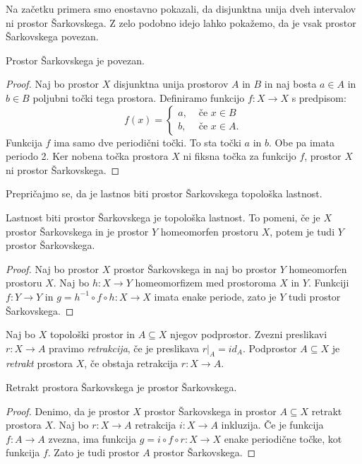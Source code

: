 \documentclass[mat2]{fmfdelo}
\begin{document}
Na začetku primera smo enostavno pokazali, da disjunktna unija dveh intervalov ni prostor Šarkovskega. Z zelo podobno idejo lahko pokažemo, da je vsak prostor Šarkovskega povezan.

\begin{trditev}
Prostor Šarkovskega je povezan.
\end{trditev}
\begin{proof}
Naj bo prostor $X$ disjunktna unija prostorov $A$ in $B$ in naj bosta $a \in A$ in $b \in B$ poljubni točki tega prostora. Definiramo funkcijo $f:X \to X$ s predpisom:
\[ f(x) = \begin{cases}
  a, & \mbox{ če $x \in B $}\\
  b ,& \mbox{ če $x \in A$.}
  \end{cases}
  \]
Funkcija $f$ ima samo dve periodični točki. To sta točki $a$ in $b$. Obe pa imata periodo 2. Ker nobena točka prostora $X$ ni fiksna točka za funkcijo $f$, prostor $X$ ni prostor Šarkovskega.
\end{proof}

Prepričajmo se, da je lastnos biti prostor Šarkovskega topološka lastnost.

\begin{trditev}
Lastnost biti prostor Šarkovskega je topološka lastnost. To pomeni, če je $X$ prostor Šarkovskega in je prostor $Y$ homeomorfen prostoru $X$, potem je tudi $Y$ prostor Šarkovskega.
\end{trditev}
\begin{proof}
Naj bo prostor $X$ prostor Šarkovskega in naj bo prostor $Y$ homeomorfen prostoru $X$. Naj bo $h : X \to Y$ homeomorfizem med prostoroma $X$ in $Y$. Funkciji $f : Y \to Y$ in $g = h^{-1} \circ f \circ h : X \to X$ imata enake periode, zato je $Y$ tudi prostor Šarkovskega.
\end{proof}



\begin{definicija}
Naj bo $X$ topološki prostor in $A \subseteq X$ njegov podprostor. Zvezni preslikavi $r : X \to A$ pravimo \emph{retrakcija}, če je preslikava $r|_A = id_A$. Podprostor $A \subseteq X$ je \emph{retrakt} prostora $X$, če obstaja retrakcija $r: X \to A$.
\end{definicija}

\begin{trditev}
Retrakt prostora Šarkovskega je prostor Šarkovskega.
\end{trditev}
\begin{proof}
Denimo, da je prostor $X$ prostor Šarkovskega in prostor $A \subseteq X$ retrakt prostora $X$. Naj bo $r : X \to A$ retrakcija $i : X \to A$ inkluzija. Če je funkcija $f : A \to A$ zvezna, ima funkcija $g = i \circ f \circ r : X \to X$ enake periodične točke, kot funkcija $f$. Zato je tudi prostor $A$ prostor Šarkovskega.
\end{proof}
\end{document}
